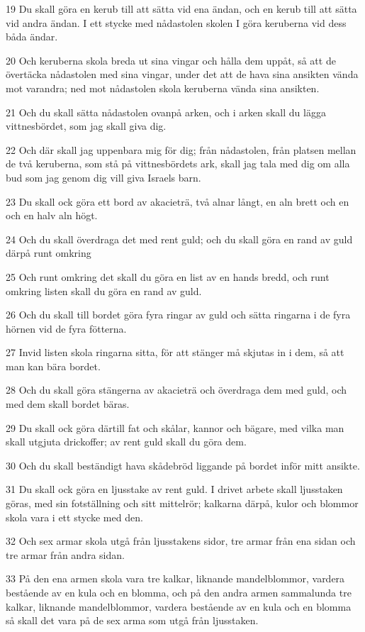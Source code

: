 \par 19 Du skall göra en kerub till att sätta vid ena ändan, och en kerub till att sätta vid andra ändan. I ett stycke med nådastolen skolen I göra keruberna vid dess båda ändar.
\par 20 Och keruberna skola breda ut sina vingar och hålla dem uppåt, så att de övertäcka nådastolen med sina vingar, under det att de hava sina ansikten vända mot varandra; ned mot nådastolen skola keruberna vända sina ansikten.
\par 21 Och du skall sätta nådastolen ovanpå arken, och i arken skall du lägga vittnesbördet, som jag skall giva dig.
\par 22 Och där skall jag uppenbara mig för dig; från nådastolen, från platsen mellan de två keruberna, som stå på vittnesbördets ark, skall jag tala med dig om alla bud som jag genom dig vill giva Israels barn.
\par 23 Du skall ock göra ett bord av akacieträ, två alnar långt, en aln brett och en och en halv aln högt.
\par 24 Och du skall överdraga det med rent guld; och du skall göra en rand av guld därpå runt omkring
\par 25 Och runt omkring det skall du göra en list av en hands bredd, och runt omkring listen skall du göra en rand av guld.
\par 26 Och du skall till bordet göra fyra ringar av guld och sätta ringarna i de fyra hörnen vid de fyra fötterna.
\par 27 Invid listen skola ringarna sitta, för att stänger må skjutas in i dem, så att man kan bära bordet.
\par 28 Och du skall göra stängerna av akacieträ och överdraga dem med guld, och med dem skall bordet bäras.
\par 29 Du skall ock göra därtill fat och skålar, kannor och bägare, med vilka man skall utgjuta drickoffer; av rent guld skall du göra dem.
\par 30 Och du skall beständigt hava skådebröd liggande på bordet inför mitt ansikte.
\par 31 Du skall ock göra en ljusstake av rent guld. I drivet arbete skall ljusstaken göras, med sin fotställning och sitt mittelrör; kalkarna därpå, kulor och blommor skola vara i ett stycke med den.
\par 32 Och sex armar skola utgå från ljusstakens sidor, tre armar från ena sidan och tre armar från andra sidan.
\par 33 På den ena armen skola vara tre kalkar, liknande mandelblommor, vardera bestående av en kula och en blomma, och på den andra armen sammalunda tre kalkar, liknande mandelblommor, vardera bestående av en kula och en blomma så skall det vara på de sex arma som utgå från ljusstaken.

